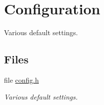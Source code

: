 \hypertarget{group__config}{\section{Configuration}
\label{group__config}
}


Various default settings.  


\subsection*{Files}
\begin{DoxyCompactItemize}
\item 
file \hyperlink{config_8h}{config.\-h}
\begin{DoxyCompactList}\small\item\em Various default settings. \end{DoxyCompactList}\end{DoxyCompactItemize}
